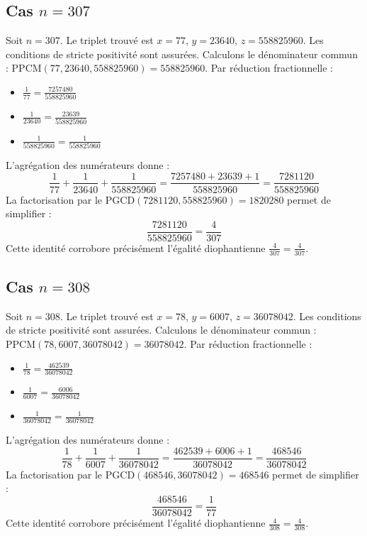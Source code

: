 \documentclass[11pt,a4paper]{article}
\begin{document}
\subsection{Cas $n = 307$}
Soit $n = 307$. Le triplet trouvé est $x = 77$, $y = 23640$, $z = 558825960$.
Les conditions de stricte positivité sont assurées.
Calculons le dénominateur commun : $\text{PPCM}(77, 23640, 558825960) = 558825960$.
Par réduction fractionnelle :
\begin{itemize}
    \item $\frac{1}{77} = \frac{7257480}{558825960}$
    \item $\frac{1}{23640} = \frac{23639}{558825960}$
    \item $\frac{1}{558825960} = \frac{1}{558825960}$
\end{itemize}
L'agrégation des numérateurs donne :
$$ \frac{1}{77} + \frac{1}{23640} + \frac{1}{558825960} = \frac{7257480 + 23639 + 1}{558825960} = \frac{7281120}{558825960} $$
La factorisation par le $\text{PGCD}(7281120, 558825960) = 1820280$ permet de simplifier :
$$ \frac{7281120}{558825960} = \frac{4}{307} $$
Cette identité corrobore précisément l'égalité diophantienne $\frac{4}{307} = \frac{4}{307}$.

\subsection{Cas $n = 308$}
Soit $n = 308$. Le triplet trouvé est $x = 78$, $y = 6007$, $z = 36078042$.
Les conditions de stricte positivité sont assurées.
Calculons le dénominateur commun : $\text{PPCM}(78, 6007, 36078042) = 36078042$.
Par réduction fractionnelle :
\begin{itemize}
    \item $\frac{1}{78} = \frac{462539}{36078042}$
    \item $\frac{1}{6007} = \frac{6006}{36078042}$
    \item $\frac{1}{36078042} = \frac{1}{36078042}$
\end{itemize}
L'agrégation des numérateurs donne :
$$ \frac{1}{78} + \frac{1}{6007} + \frac{1}{36078042} = \frac{462539 + 6006 + 1}{36078042} = \frac{468546}{36078042} $$
La factorisation par le $\text{PGCD}(468546, 36078042) = 468546$ permet de simplifier :
$$ \frac{468546}{36078042} = \frac{1}{77} $$
Cette identité corrobore précisément l'égalité diophantienne $\frac{4}{308} = \frac{4}{308}$.
\end{document}

